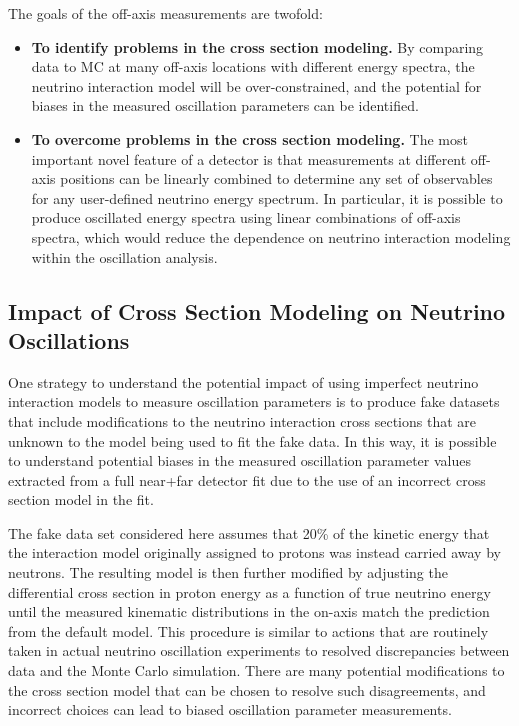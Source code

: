 The goals of the off-axis measurements are twofold:
\begin{itemize}
\item {\bf To identify problems in the cross section modeling.} By comparing   data to MC at many off-axis locations with different energy spectra, the neutrino interaction model will be over-constrained, and the potential for biases in the measured oscillation parameters can be identified.
\item {\bf To overcome problems in the cross section modeling.} The most important novel feature of a  detector is that measurements at different off-axis positions can be linearly combined to determine any set of observables for any user-defined neutrino energy spectrum. In particular, it is possible to produce oscillated energy spectra using linear combinations of   off-axis spectra, which would reduce the dependence on neutrino interaction modeling within the oscillation analysis.
\end{itemize}

\subsection{Impact of Cross Section Modeling on Neutrino Oscillations}

One strategy to understand the potential impact of using imperfect neutrino interaction models to measure oscillation parameters is to produce fake datasets that include modifications to the neutrino interaction cross sections that are unknown to the model being used to fit the fake data. In this way, it is possible to understand potential biases in the measured oscillation parameter values extracted from a full near+far detector fit due to the use of an incorrect cross section model in the fit. 

The fake data set considered here assumes that 20\% of the kinetic energy that the interaction model originally assigned to protons was instead carried away by neutrons. The resulting model is then further modified by adjusting the differential cross section in proton energy as a function of true neutrino energy until the measured kinematic distributions in the on-axis   match the prediction from the default model. This procedure is similar to actions that are routinely taken in actual neutrino oscillation experiments to resolved discrepancies between   data and the Monte Carlo simulation. There are many potential modifications to the cross section model that can be chosen to resolve such disagreements, and incorrect choices can lead to biased oscillation parameter measurements.



